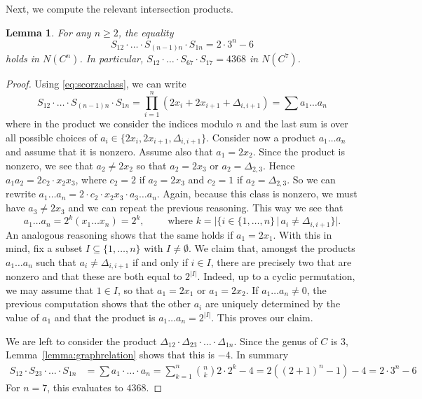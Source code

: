 \documentclass[12pt]{article}
\newtheorem{lemma}[theorem]{Lemma}
\numberwithin{equation}{section}
\theoremstyle{definition}
\begin{document}
Next, we compute the relevant intersection products.
\begin{lemma}\label{lemma:scorzaclassmany}
	For any $n\geq 2$, the equality
	\[ S_{12}\cdot \ldots \cdot S_{(n-1)n} \cdot S_{1n} = 2\cdot 3^n-6 \]
    holds in $N(C^n)$. In particular, $S_{12}\cdot \dots \cdot S_{67} \cdot S_{17} = 4368$ in $N(C^7)$.
\end{lemma}
\begin{proof}
	Using \eqref{eq:scorzaclass}, we can write
	\[ S_{12}\cdot \ldots \cdot S_{(n-1)n} \cdot S_{1n} = \prod_{i=1}^n (2x_i + 2x_{i+1}+\Delta_{i,i+1}) = \sum a_1\dots a_n \]
	where in the product we consider the indices modulo $n$ and the last sum is over all possible choices of $a_i \in \{2x_i,2x_{i+1},\Delta_{i,i+1}\}$. Consider now a product $a_1\dots a_n$ and assume that it is nonzero. Assume also that $a_1=2x_2$. Since the product is nonzero, we see that $a_2 \ne 2x_2$ so that $a_2=2x_3$ or $a_2 = \Delta_{2,3}$. Hence $a_1a_2 = 2c_2\cdot x_2x_3$, where $c_2=2$ if $a_2=2x_3$ and $c_2 = 1$ if $a_2 = \Delta_{2,3}$. So we can rewrite $a_1\dots a_n = 2\cdot c_2 \cdot  x_2x_3 \cdot a_3\dots a_n$. Again, because this class is nonzero, we must have $a_3\ne 2x_3$ and we can repeat the previous reasoning. This way we see that
	\[  a_1\dots a_n = 2^k (x_1\dots x_n) = 2^k, \qquad \text{ where } k = |\{i \in \{1,\dots, n \} \,|\, a_i\ne \Delta_{i,i+1} \}|. \]
	An analogous reasoning shows that the same holds if $a_1 = 2x_{1}$. With this in mind, fix a subset $I\subseteq \{1,\dots,n\}$ with $I\ne \emptyset$. We claim that, amongst the products $a_1\dots a_n$ such that $a_i \ne \Delta_{i,i+1}$ if and only if $i\in I$, there are precisely two that are nonzero and that these are both equal to $2^{|I|}$. Indeed, up to a cyclic permutation, we may assume that $1\in I$, so that $a_1=2x_1$ or $a_1=2x_2$. If $a_1\dots a_n\ne 0$, the previous computation shows that the other $a_i$ are uniquely determined by the value of $a_1$ and that the product is $a_1\dots a_n = 2^{|I|}$. This proves our claim. 

	We are left to consider the product $\Delta_{12}\cdot \Delta_{23} \cdot \ldots\cdot \Delta_{1n}$. Since the genus of $C$ is $3$, Lemma~\ref{lemma:graphrelation} shows that this is $-4$. In summary 
	\begin{align*}
	S_{12}\cdot S_{23} \cdot \ldots \cdot S_{1n} &= \sum a_1\cdot \ldots \cdot a_n = \sum_{k=1}^n \binom{n}{k} 2\cdot 2^k -4 = 2((2+1)^n-1)-4 = 2\cdot 3^n-6 
    \end{align*}
    For $n=7$, this evaluates to $4368$.  
\end{proof}
\end{document}
